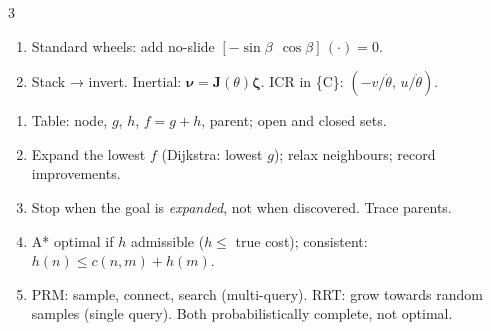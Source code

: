 \begin{multicols}{3}
\begin{recipe}
\begin{enumerate}
\item Standard wheels: add no-slide $[-\sin\beta\ \ \cos\beta]\,(\cdot)=0$.
\item Stack → invert. Inertial: $\boldsymbol\nu=\mathbf J(\theta)\boldsymbol\zeta$. ICR in \{C\}: $(-v/\dot\theta,\,u/\dot\theta)$.
\end{enumerate}
\end{recipe}
\begin{recipe}\label{r:plan}
\begin{enumerate}
\item Table: node, $g$, $h$, $f=g+h$, parent; open and closed sets.
\item Expand the lowest $f$ (Dijkstra: lowest $g$); relax neighbours; record improvements.
\item Stop when the goal is \emph{expanded}, not when discovered. Trace parents.
\item A* optimal if $h$ admissible ($h\le$ true cost); consistent: $h(n)\le c(n,m)+h(m)$.
\item PRM: sample, connect, search (multi-query). RRT: grow towards random samples (single query). Both probabilistically complete, not optimal.
\end{enumerate}
\end{recipe}
\end{multicols}
